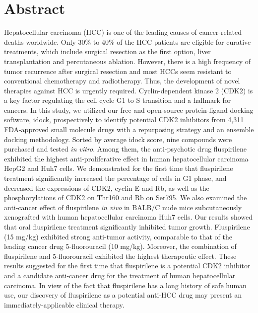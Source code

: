 \documentclass[10pt,letterpaper]{article}
\begin{document}
\section*{Abstract}

Hepatocellular carcinoma (HCC) is one of the leading causes of cancer-related deaths worldwide. Only 30\% to 40\% of the HCC patients are eligible for curative treatments, which include surgical resection as the first option, liver transplantation and percutaneous ablation. However, there is a high frequency of tumor recurrence after surgical resection and most HCCs seem resistant to conventional chemotherapy and radiotherapy. Thus, the development of novel therapies against HCC is urgently required. Cyclin-dependent kinase 2 (CDK2) is a key factor regulating the cell cycle G1 to S transition and a hallmark for cancers. In this study, we utilized our free and open-source protein-ligand docking software, idock, prospectively to identify potential CDK2 inhibitors from 4,311 FDA-approved small molecule drugs with a repurposing strategy and an ensemble docking methodology. Sorted by average idock score, nine compounds were purchased and tested \textit{in vitro}. Among them, the anti-psychotic drug fluspirilene exhibited the highest anti-proliferative effect in human hepatocellular carcinoma HepG2 and Huh7 cells. We demonstrated for the first time that fluspirilene treatment significantly increased the percentage of cells in G1 phase, and decreased the expressions of CDK2, cyclin E and Rb, as well as the phosphorylations of CDK2 on Thr160 and Rb on Ser795. We also examined the anti-cancer effect of fluspirilene \textit{in vivo} in BALB/C nude mice subcutaneously xenografted with human hepatocellular carcinoma Huh7 cells. Our results showed that oral fluspirilene treatment significantly inhibited tumor growth. Fluspirilene (15 mg/kg) exhibited strong anti-tumor activity, comparable to that of the leading cancer drug 5-fluorouracil (10 mg/kg). Moreover, the combination of fluspirilene and 5-fluorouracil exhibited the highest therapeutic effect. These results suggested for the first time that fluspirilene is a potential CDK2 inhibitor and a candidate anti-cancer drug for the treatment of human hepatocellular carcinoma. In view of the fact that fluspirilene has a long history of safe human use, our discovery of fluspirilene as a potential anti-HCC drug may present an immediately-applicable clinical therapy.

\end{document}
